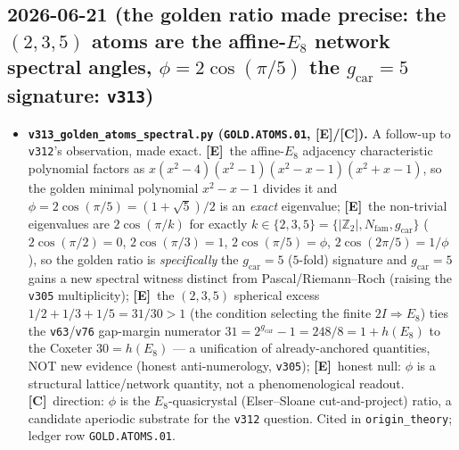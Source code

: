 \documentclass[11pt]{article}
\providecommand{\mE}{\textbf{[E]}}\providecommand{\mC}{\textbf{[C]}}
\providecommand{\gcar}{g_{\mathrm{car}}}\providecommand{\Nfam}{N_{\mathrm{fam}}}
\begin{document}
\subsection*{2026-06-21 (the golden ratio made precise: the $(2,3,5)$ atoms are the affine-$E_8$ network spectral angles, $\phi=2\cos(\pi/5)$ the $\gcar{=}5$ signature: \texttt{v313})}
\begin{itemize}
\item \textbf{\texttt{v313\_golden\_atoms\_spectral.py} (\texttt{GOLD.ATOMS.01}, \mE/\mC).} A follow-up to \texttt{v312}'s
  observation, made exact. \mE\ the affine-$E_8$ adjacency characteristic polynomial factors as
  $x(x^2{-}4)(x^2{-}1)(x^2{-}x{-}1)(x^2{+}x{-}1)$, so the golden minimal polynomial $x^2{-}x{-}1$ divides it and
  $\phi=2\cos(\pi/5)=(1{+}\sqrt5)/2$ is an \emph{exact} eigenvalue; \mE\ the non-trivial eigenvalues are
  $2\cos(\pi/k)$ for exactly $k\in\{2,3,5\}=\{|\mathbb Z_2|,\Nfam,\gcar\}$ ($2\cos(\pi/2){=}0$, $2\cos(\pi/3){=}1$,
  $2\cos(\pi/5){=}\phi$, $2\cos(2\pi/5){=}1/\phi$), so the golden ratio is \emph{specifically} the $\gcar{=}5$
  ($5$-fold) signature and $\gcar{=}5$ gains a new spectral witness distinct from Pascal/Riemann--Roch (raising the
  \texttt{v305} multiplicity); \mE\ the $(2,3,5)$ spherical excess $1/2{+}1/3{+}1/5=31/30>1$ (the condition selecting
  the finite $2I\Rightarrow E_8$) ties the \texttt{v63}/\texttt{v76} gap-margin numerator $31=2^{\gcar}{-}1=248/8=1{+}h(E_8)$
  to the Coxeter $30=h(E_8)$ --- a unification of already-anchored quantities, NOT new evidence (honest
  anti-numerology, \texttt{v305}); \mE\ honest null: $\phi$ is a structural lattice/network quantity, not a
  phenomenological readout. \mC\ direction: $\phi$ is the $E_8$-quasicrystal (Elser--Sloane cut-and-project) ratio,
  a candidate aperiodic substrate for the \texttt{v312} question. Cited in \texttt{origin\_theory}; ledger row
  \texttt{GOLD.ATOMS.01}.
\end{itemize}
\end{document}
